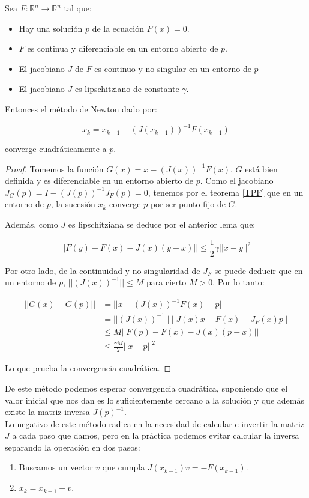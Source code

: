 \begin{theorem}\label{convergencia-local-newton}
Sea $F : \mathbb{R}^n \to \mathbb{R}^n$ tal que:

\begin{itemize}
	\item Hay una solución $p$ de la ecuación $F(x)=0$.
	\item $F$ es continua y diferenciable en un entorno abierto de $p$.
	\item El jacobiano $J$ de $F$ es continuo y no singular en un entorno de $p$
	\item El jacobiano $J$ es lipschitziano de constante $\gamma$.
\end{itemize}

Entonces el método de Newton dado por:

\[ x_{k} = x_{k-1} - (J(x_{k-1}))^{-1}F(x_{k-1}) \]

converge cuadráticamente a $p$.
\end{theorem}
\begin{proof}
Tomemos la función $G(x) = x - (J(x))^{-1}F(x)$. $G$ está bien definida y es diferenciable en un entorno abierto de $p$.
Como el jacobiano $J_G(p) = I - (J(p))^{-1}J_F(p) = 0$, tenemos por el teorema \ref{TPF} que en un entorno de $p$, la sucesión $x_{k}$ converge $p$ por ser punto fijo de $G$.

Además, como $J$ es lipschitziana se deduce por el anterior lema que:

$$ || F(y)-F(x)-J(x)(y-x) || \leq \frac{1}{2} \gamma ||x-y||^2 $$

Por otro lado, de la continuidad y no singularidad de $J_F$ se puede deducir que en un entorno de $p$, $||(J(x))^{-1}|| \leq M$ para cierto $M > 0$. Por lo tanto:

\begin{align*}||G(x)-G(p)|| & = || x-(J(x))^{-1}F(x)-p||\\
& = ||(J(x))^{-1}||\ || J(x)x-F(x)-J_F(x)p||\\
& \leq M || F(p) - F(x) - J(x)(p-x)||\\
& \leq \frac{\gamma M}{2} ||x-p||^2
\end{align*}

Lo que prueba la convergencia cuadrática.
\end{proof}

De este método podemos esperar convergencia cuadrática, suponiendo que el valor inicial que nos dan es lo suficientemente cercano a la solución y que además existe la matriz inversa $J(p)^{-1}$. \\
Lo negativo de este método radica en la necesidad de calcular e invertir la matriz $J$ a cada paso que damos, pero en la práctica podemos evitar calcular la inversa separando la operación en dos pasos:
\begin{enumerate}
	\item Buscamos un vector $v$ que cumpla $J(x_{k-1})v = -F(x_{k-1})$.
	\item $x_{k} = x_{k-1} + v$.
\end{enumerate}
